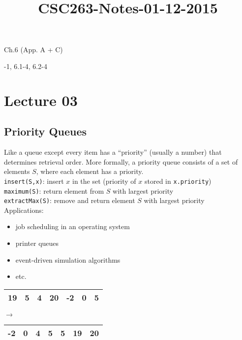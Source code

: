 



\title{CSC263-Notes-01-12-2015}



\reversemarginpar
\mpreadings

\noindent Ch.6 (App. A + C) \\

\mpselftest

-1, 6.1-4, 6.2-4

\section*{Lecture 03}

\subsection*{Priority Queues}

\noindent Like a queue except every item has a ``priority'' (usually a number) that determines retrieval order.
More formally, a priority queue consists of a set of elements $S$, where each element has a priority. \\

\texttt{insert(S,x)}: insert $x$ in the set (priority of $x$ stored in \texttt{x.priority}) \\
\indent \texttt{maximum(S)}: return element from $S$ with largest priority \\
\indent \texttt{extractMax(S)}: remove and return element $S$ with largest priority \\

\noindent Applications:
\begin{itemize}
	\item job scheduling in an operating system
	\item printer queues
	\item event-driven simulation algorithms
	\item etc.
\end{itemize}

\noindent \begin{tabular}{| l | l | l | l | l | l | l | }
	\hline 19 & 5 & 4 & 20 & -2 & 0 & 5 \\ \hline
\end{tabular} $\rightarrow$
\begin{tabular}{| l | l | l | l | l | l | l | }
	\hline -2 & 0 & 4 & 5 & 5 & 19 & 20 \\ \hline
\end{tabular} \\

